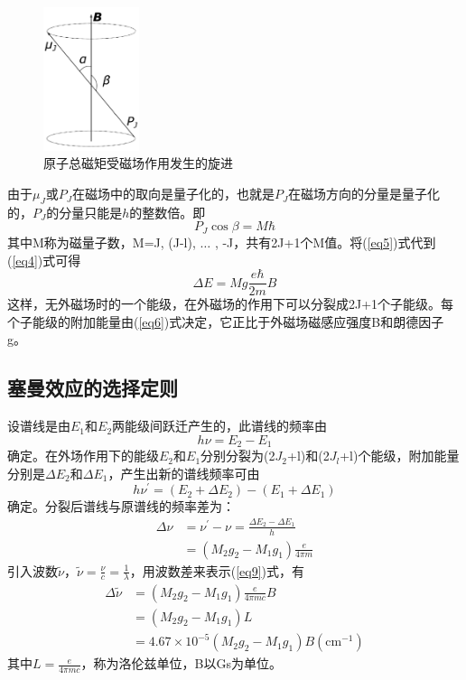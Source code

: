 \documentclass[a4paper]{article}
\begin{document}
\begin{figure}
\includegraphics[width=0.25\textwidth]{fig/fig2.pdf}
\caption{原子总磁矩受磁场作用发生的旋进}\label{fig2}
\end{figure}

由于$\mu_J$或$P_J$在磁场中的取向是量子化的，也就是$P_J$在磁场方向的分量是量子化的，$P_J$的分量只能是$h$的整数倍。即
\begin{equation}
P_J\cos\beta = M\hbar\label{eq5}
\end{equation}
其中M称为磁量子数，M=J, (J-l), $\dots$ , -J，共有2J+1个M值。将(\ref{eq5})式代到(\ref{eq4})式可得
\begin{equation}
\Delta E = Mg\frac{e\hbar}{2m}B\label{eq6}
\end{equation}
这样，无外磁场时的一个能级，在外磁场的作用下可以分裂成2J+1个子能级。每个子能级的附加能量由(\ref{eq6})式决定，它正比于外磁场磁感应强度B和朗德因子g。
\subsection{塞曼效应的选择定则}
设谱线是由$E_1$和$E_2$两能级间跃迁产生的，此谱线的频率由
\begin{equation}
h\nu = E_2 - E_1\label{eq7}
\end{equation}
确定。在外场作用下的能级$E_2$和$E_1$分别分裂为(2$J_2$+l)和(2$J_l$+l)个能级，附加能量分别是$\Delta E_2$和$\Delta E_1$，产生出新的谱线频率可由
\begin{equation}
h\nu^{'} = (E_2+\Delta E_2) - (E_1+\Delta E_1)\label{eq8}
\end{equation}
确定。分裂后谱线与原谱线的频率差为：
\begin{equation}
\begin{split}
\Delta\nu &= \nu^{'} - \nu = \frac{\Delta E_2 - \Delta E_1}{h}\\
&= (M_2g_2 - M_1g_1)\frac{e}{4\pi m}\label{eq9}
\end{split}
\end{equation}
引入波数$\tilde{\nu}$，$\tilde{\nu} = \frac{\nu}{c} = \frac{1}{\lambda}$，用波数差来表示(\ref{eq9})式，有
\begin{equation}
\begin{split}
\Delta\tilde{\nu} &= (M_2g_2 - M_1g_1)\frac{e}{4\pi mc}B\\
&= (M_2g_2 - M_1g_1)L\\
&= 4.67\times 10^{-5}(M_2g_2 - M_1g_1)B(\text{cm}^{-1})\label{eq10}
\end{split}
\end{equation}
其中$L = \frac{e}{4\pi mc}$，称为洛伦兹单位，B以Gs为单位。
\end{document}
